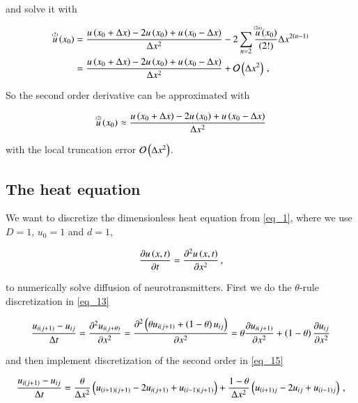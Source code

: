 \documentclass[11pt,english,a4paper]{article}
\begin{document}
\begin{flushleft}
and solve it with

\begin{align*}
\T{u}{(2)}\p{x_0} &= \frac{u\p{x_0+\Delta x} - 2 u\p{x_0} + u\p{x_0-\Delta x}}{\Delta x^2} - 2\sum_{n=2} \frac{\T{u}{(2n)}\p{x_0}}{(2!)}\Delta x^{2(n-1)}
\\ &=  \frac{u\p{x_0+\Delta x} - 2 u\p{x_0} + u\p{x_0-\Delta x}}{\Delta x^2} + \mathcal{O}\p{\Delta x^2}\,,
\end{align*}

So the second order derivative can be approximated with

\begin{align}
\T{u}{(2)}\p{x_0} \approx   \frac{u\p{x_0+\Delta x} - 2 u\p{x_0} + u\p{x_0-\Delta x}}{\Delta x^2}
\label{eq_15}
\end{align}

with the local truncation error $\mathcal{O}\p{\Delta x^2}$.

\subsection{The heat equation}

We want to discretize the dimensionless heat equation from \eqref{eq_1}, where we use $D=1$, $u_0=1$ and $d=1$, 

\begin{align*}
\frac{\partial u\p{x,t}}{\partial t} = \frac{\partial^2 u\p{x,t}}{\partial x^2}\,,
\end{align*}

to numerically solve diffusion of neurotransmitters. First we do the $\theta$-rule discretization in \eqref{eq_13} 

\begin{align*}
\frac{u_{i(j+1)}-u_{ij}}{\Delta t} = \frac{\partial^2 u_{i(j+\theta)}}{\partial x^2} = \frac{\partial^2 \p{\theta u_{i(j+1)}+\p{1-\theta}u_{ij}}}{\partial x^2} = \theta \frac{\partial u_{i(j+1)}}{\partial x^2} + \p{1-\theta}\frac{\partial u_{ij}}{\partial x^2}
\end{align*}

and then implement discretization of the second order in \eqref{eq_15}

\begin{align}
\frac{u_{i(j+1)}-u_{ij}}{\Delta t} = \frac{\theta}{\Delta x^2}\p{u_{(i+1)(j+1)} - 2 u_{i(j+1)} + u_{(i-1)(j+1)}} + \frac{1-\theta}{\Delta x^2}\p{u_{(i+1)j} - 2u_{ij} +u_{(i-1)j}} \,,
\label{eq_16}
\end{align}


\end{flushleft}
\end{document}
